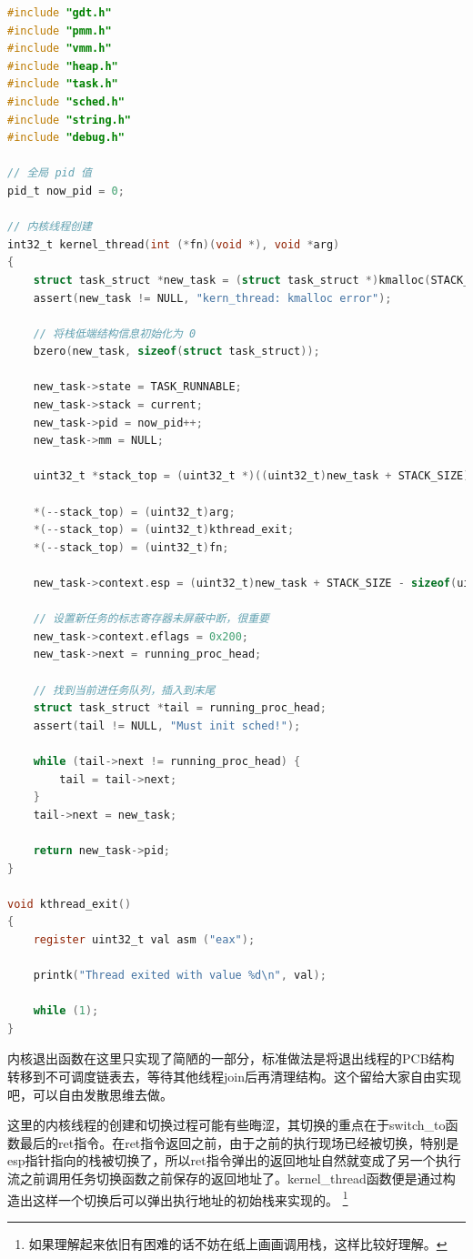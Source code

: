 \begin{lstlisting}[language = C, caption = include/task.h]
#include "gdt.h"
#include "pmm.h"
#include "vmm.h"
#include "heap.h"
#include "task.h"
#include "sched.h"
#include "string.h"
#include "debug.h"

// 全局 pid 值
pid_t now_pid = 0;

// 内核线程创建
int32_t kernel_thread(int (*fn)(void *), void *arg)
{
	struct task_struct *new_task = (struct task_struct *)kmalloc(STACK_SIZE);
	assert(new_task != NULL, "kern_thread: kmalloc error");

	// 将栈低端结构信息初始化为 0 
	bzero(new_task, sizeof(struct task_struct));

	new_task->state = TASK_RUNNABLE;
	new_task->stack = current;
	new_task->pid = now_pid++;
	new_task->mm = NULL;

	uint32_t *stack_top = (uint32_t *)((uint32_t)new_task + STACK_SIZE);

	*(--stack_top) = (uint32_t)arg;
	*(--stack_top) = (uint32_t)kthread_exit;
	*(--stack_top) = (uint32_t)fn;

	new_task->context.esp = (uint32_t)new_task + STACK_SIZE - sizeof(uint32_t) * 3;

	// 设置新任务的标志寄存器未屏蔽中断，很重要
	new_task->context.eflags = 0x200;
	new_task->next = running_proc_head;
	
	// 找到当前进任务队列，插入到末尾
	struct task_struct *tail = running_proc_head;
	assert(tail != NULL, "Must init sched!");

	while (tail->next != running_proc_head) {
		tail = tail->next;
	}
	tail->next = new_task;

	return new_task->pid;
}

void kthread_exit()
{
	register uint32_t val asm ("eax");

	printk("Thread exited with value %d\n", val);

	while (1);
}

\end{lstlisting}

\par 内核退出函数在这里只实现了简陋的一部分，标准做法是将退出线程的PCB结构转移到不可调度链表去，等待其他线程join后再清理结构。这个留给大家自由实现吧，可以自由发散思维去做。

\par 这里的内核线程的创建和切换过程可能有些晦涩，其切换的重点在于switch\_to函数最后的ret指令。在ret指令返回之前，由于之前的执行现场已经被切换，特别是esp指针指向的栈被切换了，所以ret指令弹出的返回地址自然就变成了另一个执行流之前调用任务切换函数之前保存的返回地址了。kernel\_thread函数便是通过构造出这样一个切换后可以弹出执行地址的初始栈来实现的。
\footnote{如果理解起来依旧有困难的话不妨在纸上画画调用栈，这样比较好理解。}

